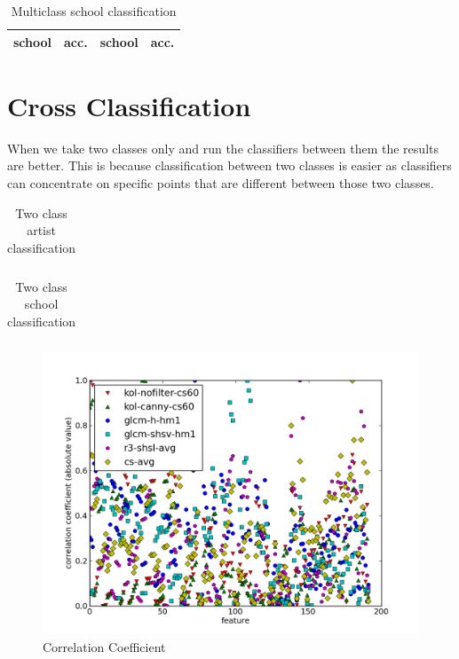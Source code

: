 \documentclass[11pt,a4paper,twoside,openright,draft]{report}
\begin{document}
\begin{multicols}{2}
\begin{table}[ptb]
\centering
\begin{tabular}{|l|r||l|r|}
\toprule
school & acc. & school & acc. \\
\midrule

\bottomrule
\end{tabular}
\caption[Multiclass school classification]{Multiclass school classification}
\label{tab:predsch}
\end{table}

\section{Cross Classification}

When we take two classes only and run the classifiers between them the results
are better.  This is because classification between two classes is easier as
classifiers can concentrate on specific points that are different between those
two classes.

\begin{table}[ptb]
\centering
\begin{tabular}{r||r|r|r|r|r}
\toprule

\bottomrule
\end{tabular}
\caption[Two class artist classification]{Two class artist classification}
\label{tab:foldart}
\end{table}

\begin{table}[ptb]
\centering
{}
\begin{tabular}{r||r|r|r|r|r}
\toprule

\bottomrule
\end{tabular}
\caption[Two class school classification]{Two class school classification}
\label{tab:foldsch}
\end{table}

\begin{figure}[tbp]
\centering
\includegraphics[width=\textwidth]{corr-graph}
\caption[Correlation]{Correlation Coefficient}
\label{fig:corr}
\end{figure}


\end{multicols}
\end{document}
